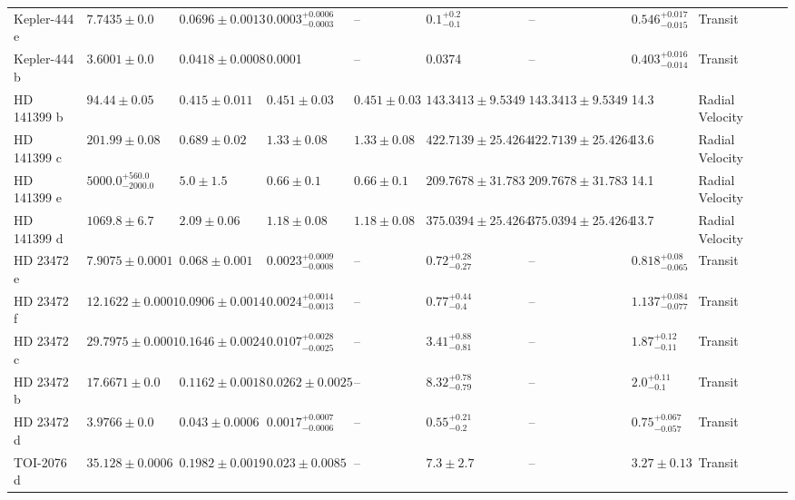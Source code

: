 \begin{tabular}{llllllllll}
Kepler-444 e & $7.7435 \pm 0.0$ & $0.0696 \pm 0.0013$ & $0.0003^{+0.0006}_{-0.0003}$ & -- & $0.1^{+0.2}_{-0.1}$ & -- & $0.546^{+0.017}_{-0.015}$ & Transit & \cite{CAMPANTE_ET_AL__2015} \\
Kepler-444 b & $3.6001 \pm 0.0$ & $0.0418 \pm 0.0008$ & 0.0001 & -- & 0.0374 & -- & $0.403^{+0.016}_{-0.014}$ & Transit & \cite{CAMPANTE_ET_AL__2015} \\
HD 141399 b & $94.44 \pm 0.05$ & $0.415 \pm 0.011$ & $0.451 \pm 0.03$ & $0.451 \pm 0.03$ & $143.3413 \pm 9.5349$ & $143.3413 \pm 9.5349$ & 14.3 & Radial Velocity & \cite{H_EACUTE_BRARD_ET_AL__2016} \\
HD 141399 c & $201.99 \pm 0.08$ & $0.689 \pm 0.02$ & $1.33 \pm 0.08$ & $1.33 \pm 0.08$ & $422.7139 \pm 25.4264$ & $422.7139 \pm 25.4264$ & 13.6 & Radial Velocity & \cite{H_EACUTE_BRARD_ET_AL__2016} \\
HD 141399 e & $5000.0^{+560.0}_{-2000.0}$ & $5.0 \pm 1.5$ & $0.66 \pm 0.1$ & $0.66 \pm 0.1$ & $209.7678 \pm 31.783$ & $209.7678 \pm 31.783$ & 14.1 & Radial Velocity & \cite{H_EACUTE_BRARD_ET_AL__2016} \\
HD 141399 d & $1069.8 \pm 6.7$ & $2.09 \pm 0.06$ & $1.18 \pm 0.08$ & $1.18 \pm 0.08$ & $375.0394 \pm 25.4264$ & $375.0394 \pm 25.4264$ & 13.7 & Radial Velocity & \cite{H_EACUTE_BRARD_ET_AL__2016} \\
HD 23472 e & $7.9075 \pm 0.0001$ & $0.068 \pm 0.001$ & $0.0023^{+0.0009}_{-0.0008}$ & -- & $0.72^{+0.28}_{-0.27}$ & -- & $0.818^{+0.08}_{-0.065}$ & Transit & \cite{BARROS_ET_AL_2022} \\
HD 23472 f & $12.1622 \pm 0.0001$ & $0.0906 \pm 0.0014$ & $0.0024^{+0.0014}_{-0.0013}$ & -- & $0.77^{+0.44}_{-0.4}$ & -- & $1.137^{+0.084}_{-0.077}$ & Transit & \cite{BARROS_ET_AL_2022} \\
HD 23472 c & $29.7975 \pm 0.0001$ & $0.1646 \pm 0.0024$ & $0.0107^{+0.0028}_{-0.0025}$ & -- & $3.41^{+0.88}_{-0.81}$ & -- & $1.87^{+0.12}_{-0.11}$ & Transit & \cite{BARROS_ET_AL_2022} \\
HD 23472 b & $17.6671 \pm 0.0$ & $0.1162 \pm 0.0018$ & $0.0262 \pm 0.0025$ & -- & $8.32^{+0.78}_{-0.79}$ & -- & $2.0^{+0.11}_{-0.1}$ & Transit & \cite{BARROS_ET_AL_2022} \\
HD 23472 d & $3.9766 \pm 0.0$ & $0.043 \pm 0.0006$ & $0.0017^{+0.0007}_{-0.0006}$ & -- & $0.55^{+0.21}_{-0.2}$ & -- & $0.75^{+0.067}_{-0.057}$ & Transit & \cite{BARROS_ET_AL_2022} \\
TOI-2076 d & $35.128 \pm 0.0006$ & $0.1982 \pm 0.0019$ & $0.023 \pm 0.0085$ & -- & $7.3 \pm 2.7$ & -- & $3.27 \pm 0.13$ & Transit & \cite{WANG_ET_AL_2026} \\

\end{tabular}

